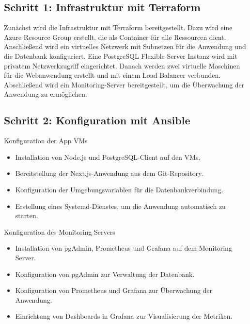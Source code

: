 \subsection{Schritt 1: Infrastruktur mit Terraform}
Zunächst wird die Infrastruktur mit Terraform bereitgestellt. Dazu wird eine Azure Resource Group erstellt, die als Container für alle Ressourcen dient. Anschließend wird ein virtuelles Netzwerk mit Subnetzen für die Anwendung und die Datenbank konfiguriert. Eine PostgreSQL Flexible Server Instanz wird mit privatem Netzwerkzugriff eingerichtet. Danach werden zwei virtuelle Maschinen für die Webanwendung erstellt und mit einem Load Balancer verbunden. Abschließend wird ein Monitoring-Server bereitgestellt, um die Überwachung der Anwendung zu ermöglichen.

\subsection{Schritt 2: Konfiguration mit Ansible}
Konfiguration der App VMs
\begin{itemize}
    \item Installation von Node.js und PostgreSQL-Client auf den VMs.
    \item Bereitstellung der Next.js-Anwendung aus dem Git-Repository.
    \item Konfiguration der Umgebungsvariablen für die Datenbankverbindung.
    \item Erstellung eines Systemd-Dienstes, um die Anwendung automatisch zu starten.
\end{itemize}

Konfiguration des Monitoring Servers
\begin{itemize}
    \item Installation von pgAdmin, Prometheus und Grafana auf dem Monitoring Server.
    \item Konfiguration von pgAdmin zur Verwaltung der Datenbank.
    \item Konfiguration von Prometheus und Grafana zur Überwachung der Anwendung.
    \item Einrichtung von Dashboards in Grafana zur Visualisierung der Metriken.
\end{itemize}
